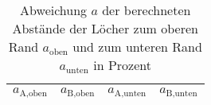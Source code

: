 \begin{table}
    \centering
    \caption{Abweichung $a$ der berechneten Abstände der Löcher zum oberen Rand $a_\text{oben}$ und zum unteren Rand $a_\text{unten}$ in Prozent}
    \label{tab:Disussion}
    \begin{tabular}{cccc}
	\toprule
	{$a_\text{A,oben}$}		& {$a_\text{B,oben}$}		& 
	{$a_\text{A,unten}$}		& {$a_\text{B,unten}$}		\\ 
	\midrule
    
    \bottomrule
    \end{tabular}
    \end{table}
